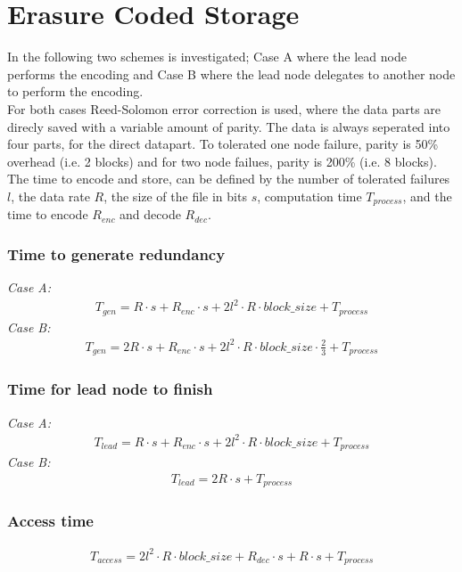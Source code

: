 \section{Erasure Coded Storage} \label{sec:ec}
In the following two schemes is investigated; Case A where the lead node performs the encoding and Case B where the lead node delegates to another node to perform the encoding.\\
For both cases Reed-Solomon error correction is used, where the data parts are direcly saved with a variable amount of parity. The data is always seperated into four parts, for the direct datapart. To tolerated one node failure, parity is 50\% overhead (i.e. 2 blocks) and for two node failues, parity is 200\% (i.e. 8 blocks).\\
The time to encode and store, can be defined by the number of tolerated failures $l$, the data rate $R$, the size of the file in bits $s$, computation time $T_{process}$, and the time to encode $R_{enc}$ and decode $R_{dec}$.

\subsubsection*{Time to generate redundancy}
\textit{Case A:} 
\begin{align}
    T_{gen} = R \cdot s + R_{enc} \cdot s + 2l^{2} \cdot R \cdot block\_size + T_{process}
\end{align}
\textit{Case B:} 
\begin{align}
    T_{gen} = 2R \cdot s + R_{enc} \cdot s + 2l^{2} \cdot R \cdot block\_size \cdot \frac{2}{3} + T_{process}
\end{align}

\subsubsection*{Time for lead node to finish}
\textit{Case A:} 
\begin{align}
    T_{lead} = R \cdot s + R_{enc} \cdot s + 2l^{2} \cdot R \cdot block\_size + T_{process}
\end{align}
\textit{Case B:} 
\begin{align}
    T_{lead} = 2R \cdot s + T_{process}
\end{align}

\subsubsection*{Access time}
\begin{align}
    T_{access} = 2l^{2} \cdot R \cdot block\_size + R_{dec} \cdot s + R \cdot s + T_{process}
\end{align}

